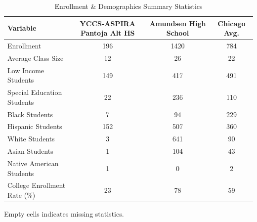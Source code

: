 \begin{table}[H]
\renewcommand{\arraystretch}{1.5}
\caption*{
{\large Enrollment \& Demographics Summary Statistics}
} 

\fontsize{10pt}{11pt}\selectfont

\begin{tabular*}{\linewidth}{@{\extracolsep{\fill}}lccc}
\toprule
Variable & YCCS-ASPIRA Pantoja Alt HS & Amundsen High School & Chicago Avg. \\ 
\midrule\addlinespace[2.5pt]
Enrollment & 196 & 1420 & 784 \\
Average Class Size & 12 & 26 & 22 \\
Low Income Students & 149 & 417 & 491 \\
Special Education Students & 22 & 236 & 110 \\
Black Students & 7 & 94 & 229 \\
Hispanic Students & 152 & 507 & 360 \\
White Students & 3 & 641 & 90 \\
Asian Students & 1 & 104 & 43 \\
Native American Students & 1 & 0 & 2 \\
College Enrollment Rate (\%) & 23 & 78 & 59 \\
\bottomrule
\end{tabular*}
\begin{minipage}{\linewidth}
Empty cells indicates missing statistics.\\
\end{minipage}
\end{table}
